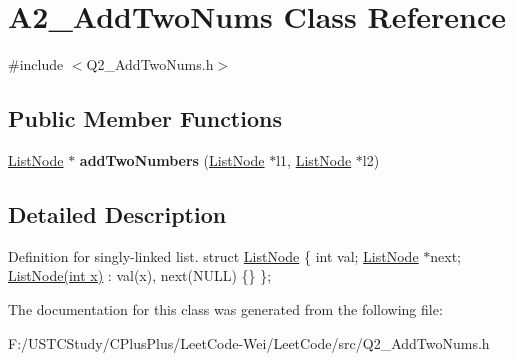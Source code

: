 \hypertarget{class_a2___add_two_nums}{}\section{A2\+\_\+\+Add\+Two\+Nums Class Reference}
\label{class_a2___add_two_nums}


{\ttfamily \#include $<$Q2\+\_\+\+Add\+Two\+Nums.\+h$>$}

\subsection*{Public Member Functions}
\begin{DoxyCompactItemize}
\item 
\hypertarget{class_a2___add_two_nums_a9325b7b0abb76432f07a56bdc21b7f4e}{}\label{class_a2___add_two_nums_a9325b7b0abb76432f07a56bdc21b7f4e} 
\hyperlink{struct_list_node}{List\+Node} $\ast$ {\bfseries add\+Two\+Numbers} (\hyperlink{struct_list_node}{List\+Node} $\ast$l1, \hyperlink{struct_list_node}{List\+Node} $\ast$l2)
\end{DoxyCompactItemize}


\subsection{Detailed Description}
Definition for singly-\/linked list. struct \hyperlink{struct_list_node}{List\+Node} \{ int val; \hyperlink{struct_list_node}{List\+Node} $\ast$next; \hyperlink{struct_list_node}{List\+Node(int x)} \+: val(x), next(\+N\+U\+L\+L) \{\} \}; 

The documentation for this class was generated from the following file\+:\begin{DoxyCompactItemize}
\item 
F\+:/\+U\+S\+T\+C\+Study/\+C\+Plus\+Plus/\+Leet\+Code-\/\+Wei/\+Leet\+Code/src/Q2\+\_\+\+Add\+Two\+Nums.\+h\end{DoxyCompactItemize}
